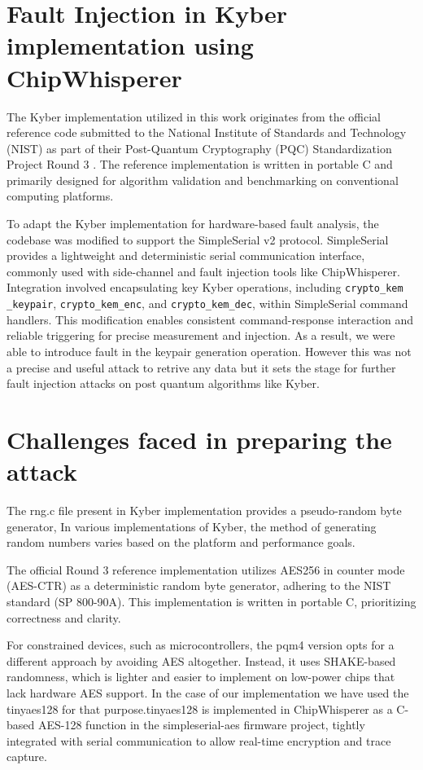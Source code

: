 \section{Fault Injection in Kyber implementation using ChipWhisperer}
The Kyber implementation utilized in this work originates from the official reference code submitted to the National Institute of Standards and Technology (NIST) as part of their Post-Quantum Cryptography (PQC) Standardization Project Round 3 \cite{nistpqc2020}. The reference implementation is written in portable C and primarily designed for algorithm validation and benchmarking on conventional computing platforms.

To adapt the Kyber implementation for hardware-based fault analysis, the codebase was modified to support the SimpleSerial v2 protocol. SimpleSerial provides a lightweight and deterministic serial communication interface, commonly used with side-channel and fault injection tools like ChipWhisperer. Integration involved encapsulating key Kyber operations, including \texttt{crypto\_kem
\_keypair}, \texttt{crypto\_kem\_enc}, and \texttt{crypto\_kem\_dec}, within SimpleSerial command handlers. This modification enables consistent command-response interaction and reliable triggering for precise measurement and injection. As a result, we were able to introduce fault in the keypair generation operation. However this was not a precise and useful attack to retrive any data but it sets the stage for further fault injection attacks on post quantum algorithms like Kyber.

\section{Challenges faced in preparing the attack}
The rng.c file present in Kyber implementation provides a pseudo-random byte generator,
In various implementations of Kyber, the method of generating random numbers varies based on the platform and performance goals. 

The official Round 3 reference implementation utilizes AES256 in counter mode (AES-CTR) as a deterministic random byte generator, adhering to the NIST standard (SP 800-90A). This implementation is written in portable C, prioritizing correctness and clarity.

For constrained devices, such as microcontrollers, the pqm4 version opts for a different approach by avoiding AES altogether. Instead, it uses SHAKE-based randomness, which is lighter and easier to implement on low-power chips that lack hardware AES support.
In the case of our implementation we have used the tinyaes128 for that purpose.tinyaes128 is implemented in ChipWhisperer as a C-based AES-128 function in the simpleserial-aes firmware project, tightly integrated with serial communication to allow real-time encryption and trace capture.

